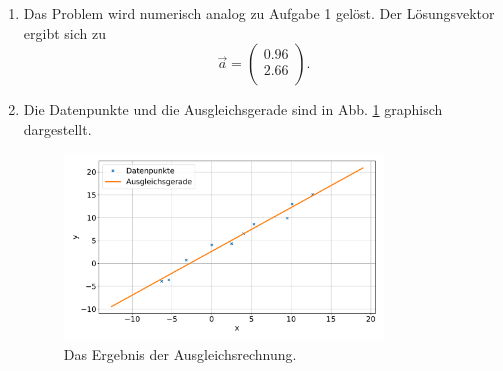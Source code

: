 \begin{enumerate}[label=\alph*)]
    \item Das Problem wird numerisch analog zu Aufgabe 1 gelöst. Der Lösungsvektor ergibt sich zu 
    \begin{equation*}
        \vec a = \begin{pmatrix}
            \num{0.96}\\
            \num{2.66}\\
        \end{pmatrix}.
    \end{equation*}

    \item   Die Datenpunkte und die Ausgleichsgerade sind in Abb. \ref{fig:ausgleich} graphisch dargestellt.
            \begin{figure}
                \centering
                \includegraphics[width=0.8\textwidth]{./bin/figure.pdf}
            \caption{Das Ergebnis der Ausgleichsrechnung.}
            \label{fig:ausgleich}
            \end{figure}
\end{enumerate}